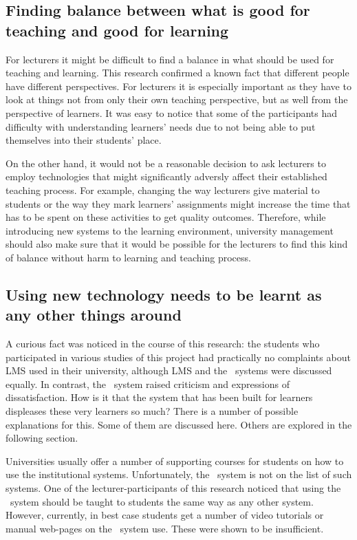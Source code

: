\subsection[Finding Balance]{Finding balance between what is good for teaching
and good for learning}

For lecturers it might be difficult to find a balance in what should be used for
teaching and learning. This research confirmed a known fact that different
people have different perspectives. For lecturers it is especially important as
they have to look at things not from only their own teaching perspective, but as
well from the perspective of learners. It was easy to notice that some of the
participants had difficulty with understanding learners' needs due to not being
able to put themselves into their students' place.

On the other hand, it would not be a reasonable decision to ask lecturers to
employ technologies that might significantly adversly affect their established
teaching process. For example, changing the way lecturers give material to
students or the way they mark learners' assignments might increase the time that
has to be spent on these activities to get quality outcomes. Therefore, while
introducing new systems to the learning environment, university management
should also make sure that it would be possible for the lecturers to find this
kind of balance without harm to learning and teaching process.

\subsection[Learning to Use Technology]{Using new technology needs to be learnt
as any other things around}

A curious fact was noticed in the course of this research: the students who
participated in various studies of this project had practically no complaints
about LMS used in their university, although LMS and the \ep~systems were
discussed equally. In contrast, the \ep~system raised criticism and expressions
of dissatisfaction. How is it that the system that has been built for learners
displeases these very learners so much? There is a number of possible
explanations for this. Some of them are discussed here. Others are explored in
the following section.

Universities usually offer a number of supporting courses for students on how to
use the institutional systems. Unfortunately, the \ep~system is not on the list
of such systems. One of the lecturer-participants of this research noticed that
using the \ep~system should be taught to students the same way as any other
system. However, currently, in best case students get a number of video tutorials
or manual web-pages on the \ep~system use. These were shown to be insufficient. 

